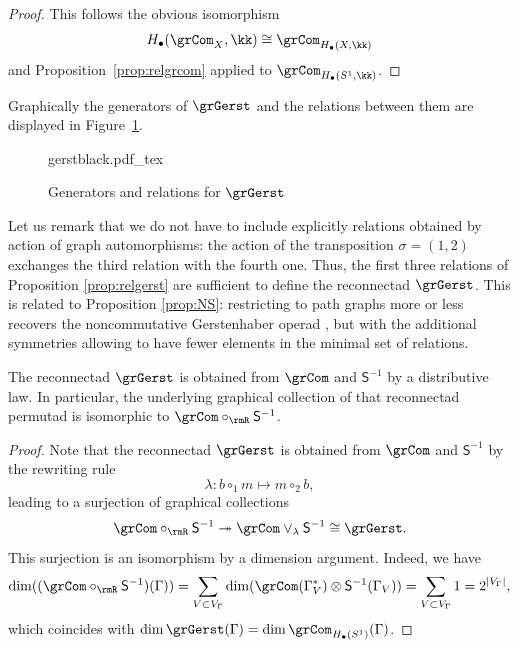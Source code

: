 \begin{proof}
This follows the obvious isomorphism
 \[
H_{\bullet}(\grCom_X,\kk)\cong \grCom_{H_{\bullet}(X,\kk)}
 \]
and Proposition~\ref{prop:relgrcom} applied to $\grCom_{H_{\bullet}(S^1,\kk)}$. 
\end{proof}

Graphically the generators of $\grGerst$ and the relations between them are displayed in Figure~\ref{fig:gerstrel}. 
\begin{figure}[ht]
    \centering
    \def\svgwidth{0.7\columnwidth}
    {gerstblack.pdf_tex}
    \caption{Generators and relations for $\grGerst$}
    \label{fig:gerstrel}
\end{figure}

Let us remark that we do not have to include explicitly relations obtained by action of graph automorphisms: the action of the transposition $\sigma=(1,2)$ exchanges the third relation with the fourth one. Thus, the first three relations of Proposition \ref{prop:relgerst} are sufficient to define the reconnectad $\grGerst$. This is related to Proposition \ref{prop:NS}: restricting to path graphs more or less recovers the noncommutative Gerstenhaber operad \cite{MR4072173}, but with the additional symmetries allowing to have fewer elements in the minimal set of relations. 

\begin{prop}\label{prop:gerst-distr}
The reconnectad $\grGerst$ is obtained from $\grCom$ and $\mathsf{S}^{-1}$ by a distributive law. In particular, the underlying graphical collection of that reconnectad permutad is isomorphic to $\grCom\circ_{\rmR}\mathsf{S}^{-1}$.
\end{prop}

\begin{proof}
Note that the reconnectad $\grGerst$ is obtained from $\grCom$ and $\mathsf{S}^{-1}$ by the rewriting rule 
 \[
\lambda\colon b\circ_1m \mapsto m\circ_2b,
 \]
leading to a surjection of graphical collections
 \[
\grCom \circ_{\rmR} \mathsf{S}^{-1}\twoheadrightarrow \grCom \vee_{\lambda} \mathsf{S}^{-1} \cong \grGerst.
 \]
This surjection is an isomorphism by a dimension argument. Indeed, we have 
 \[
\dim ((\grCom \circ_{\rmR} \mathsf{S}^{-1})(\Gamma))=\sum_{V\subset V_\Gamma} \dim (\grCom(\Gamma^*_{V})\otimes\mathsf{S}^{-1}(\Gamma_V))=
\sum_{V\subset V_\Gamma} 1=2^{|V_\Gamma|},
 \]
which coincides with $\dim \grGerst(\Gamma)=\dim\grCom_{H_\bullet(S^1)}(\Gamma)$. 
\end{proof}


